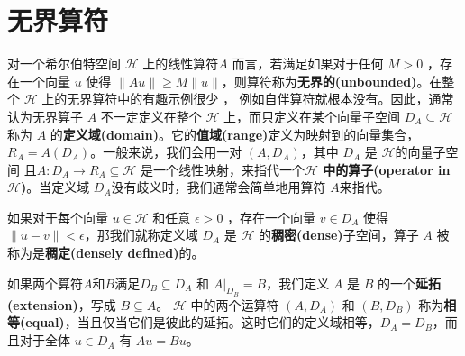 \documentclass[hyperref,UTF8]{ctexbook}
\begin{document}
\section{无界算符}\label{sec:13.6}
对一个希尔伯特空间 \(\mathcal{H}\) 上的线性算符\(A\) 而言，若满足如果对于任何 \(M>0\) ，存在一个向量 \(u\) 使得 \(\|A u \| \geq M\|u\|\)，则算符称为\textbf{无界的(unbounded)}。在整个 \(\mathcal{H}\) 上的无界算符中的有趣示例很少 ， 例如自伴算符就根本没有。因此，通常认为无界算子 \(A\) 不一定定义在整个 \(\mathcal{H}\) 上，而只定义在某个向量子空间 \(D_{A} \subseteq \mathcal{H} \) 称为 \(A\) 的\textbf{定义域(domain)}。它的\textbf{值域(range)}定义为映射到的向量集合，\(R_{A}=A\left(D_{A}\right)\)。一般来说，我们会用一对 \(\left(A, D_{A}\right)\)，其中 \(D_{A}\) 是 \(\mathcal{H}\)的向量子空间  且\(A: D_{A} \rightarrow R_{A} \subseteq \mathcal{H}\) 是一个线性映射，来指代一个\textbf{\(\mathcal{H}\) 中的算子(operator in \(\mathcal{H}\))}。当定义域 \(D_{A}\)没有歧义时，我们通常会简单地用算符 \(A\)来指代。

如果对于每个向量 \(u \in \mathcal{H}\) 和任意 \(\epsilon>0 \) ，存在一个向量 \(v \in D_{A}\) 使得 \(\|u-v\|<\epsilon\)，那我们就称定义域 \(D_{A}\) 是 \(\mathcal{H}\) 的\textbf{稠密(dense)}子空间，算子 \(A\) 被称为是\textbf{稠定(densely defined)}的。

如果两个算符\(A\)和\(B\)满足\(D_{B} \subseteq D_{A}\) 和 \(\left.A\right|_{D_{B}}=B\)，我们定义 \(A\) 是 \(B\) 的一个\textbf{延拓(extension)}，写成 \(B \subseteq A\)。 \(\mathcal{H}\) 中的两个运算符 \(\left(A, D_{A}\right)\) 和 \(\left(B, D_{B}\right)\) 称为\textbf{相等(equal)}，当且仅当它们是彼此的延拓。这时它们的定义域相等，\(D_{A}=D_{B}\)，而且对于全体 \(u \in D_{A}\) 有 \(A u=B u\)。
\end{document}
